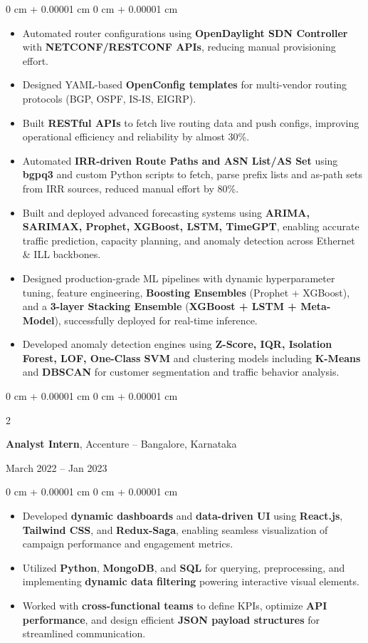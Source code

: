 \documentclass[10pt, letterpaper]{article}
\newenvironment{highlights}{
    \begin{itemize}[
        topsep=0.10 cm,
        parsep=0.10 cm,
        partopsep=0pt,
        itemsep=0pt,
        leftmargin=0 cm + 10pt
    ]
}{
    \end{itemize}
} %
\newenvironment{onecolentry}{
    \begin{adjustwidth}{
        0 cm + 0.00001 cm
    }{
        0 cm + 0.00001 cm
    }
}{
    \end{adjustwidth}
} %
\newenvironment{twocolentry}[2][]{
    \onecolentry
    \def\secondColumn{#2}
    \setcolumnwidth{\fill, 4.5 cm}
    \begin{paracol}{2}
}{
    \switchcolumn \raggedleft \secondColumn
    \end{paracol}
    \endonecolentry
} %
\begin{document}
\begin{onecolentry}
    \begin{highlights}
        \item Automated router configurations using \textbf{OpenDaylight SDN Controller} with \textbf{NETCONF/RESTCONF APIs}, reducing manual provisioning effort.
        \item Designed YAML-based \textbf{OpenConfig templates} for multi-vendor routing protocols (BGP, OSPF, IS-IS, EIGRP).
        \item Built \textbf{RESTful APIs} to fetch live routing data and push configs, improving operational efficiency and reliability by almost 30\%.
        \item Automated \textbf{IRR-driven Route Paths and ASN List/AS Set} using \textbf{bgpq3} and custom Python scripts to fetch, parse prefix lists and as-path sets from IRR sources, reduced manual effort by 80\%.
        \item Built and deployed advanced forecasting systems using \textbf{ARIMA, SARIMAX, Prophet, XGBoost, LSTM, TimeGPT}, enabling accurate traffic prediction, capacity planning, and anomaly detection across Ethernet \& ILL backbones.
        \item Designed production-grade ML pipelines with dynamic hyperparameter tuning, feature engineering, \textbf{Boosting Ensembles} (Prophet + XGBoost), and a \textbf{3-layer Stacking Ensemble} (\textbf{XGBoost + LSTM + Meta-Model}), successfully deployed for real-time inference.
        \item Developed anomaly detection engines using \textbf{Z-Score, IQR, Isolation Forest, LOF, One-Class SVM} and clustering models including \textbf{K-Means} and \textbf{DBSCAN} for customer segmentation and traffic behavior analysis.
    \end{highlights}
\end{onecolentry}
\vspace{0.2 cm}
\begin{twocolentry}{
    March 2022 – Jan 2023
}
    \textbf{Analyst Intern}, Accenture -- Bangalore, Karnataka
\end{twocolentry}
\vspace{0.10 cm}
\begin{onecolentry}
    \begin{highlights}
        \item Developed \textbf{dynamic dashboards} and \textbf{data-driven UI} using \textbf{React.js}, \textbf{Tailwind CSS}, and \textbf{Redux-Saga}, enabling seamless visualization of campaign performance and engagement metrics.
        \item Utilized \textbf{Python}, \textbf{MongoDB}, and \textbf{SQL} for querying, preprocessing, and implementing \textbf{dynamic data filtering} powering interactive visual elements.
        \item Worked with \textbf{cross-functional teams} to define KPIs, optimize \textbf{API performance}, and design efficient \textbf{JSON payload structures} for streamlined communication.
    \end{highlights}
\end{onecolentry}
\end{document}
